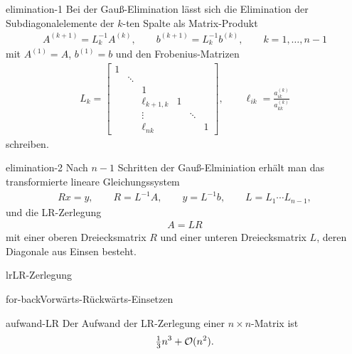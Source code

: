 \begin{Lemma}{elimination-1}
  Bei der Gauß-Elimination lässt sich die Elimination der
  Subdiagonalelemente der $k$-ten Spalte als Matrix-Produkt
  \begin{gather}
    A^{(k+1)} = L^{-1}_k A^{(k)},
    \qquad b^{(k+1)} = L^{-1}_k b^{(k)},
    \qquad k=1,\dots,n-1
  \end{gather}
  mit $A^{(1)}=A$, $b^{(1)}=b$ und den Frobenius-Matrizen
  \begin{gather}
    L_k =\begin{bmatrix}
      1 & & & & & \\
      &\ddots & & & & \\
      &   & 1& & &\\
      &   & \ell_{k+1,k}&1 & &\\
      &   & \vdots& &\ddots &\\
      &   & \ell_{nk}& & &1
    \end{bmatrix},
    \qquad
    \ell_{ik} = \frac{a_{ik}^{(k)}}{a_{kk}^{(k)}}
  \end{gather}
  schreiben.
\end{Lemma}

\begin{Satz}{elimination-2}
  Nach $n-1$ Schritten der Gauß-Elminiation erhält man das transformierte lineare Gleichungssystem
  \begin{gather}
    R x = y,\qquad R = L^{-1}A, \qquad y=L^{-1}b,
    \qquad L = L_1\cdots L_{n-1},
  \end{gather}
  und die LR-Zerlegung
  \begin{gather}
    A = LR
  \end{gather}
  mit einer oberen Dreiecksmatrix $R$ und einer unteren Dreiecksmatrix
  $L$, deren Diagonale aus Einsen besteht.
\end{Satz}

\begin{Algorithmus*}{lr}{LR-Zerlegung}
  
\end{Algorithmus*}

\begin{Algorithmus*}{for-back}{Vorwärts-Rückwärts-Einsetzen}
  
\end{Algorithmus*}

\begin{Lemma}{aufwand-LR}
  Der Aufwand der LR-Zerlegung einer $n\times n$-Matrix ist
  \begin{gather}
    \tfrac13 n^3 + \mathcal O(n^2).
  \end{gather}
\end{Lemma}

